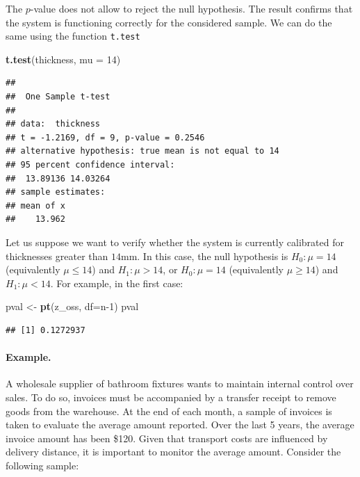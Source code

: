 \documentclass[
]{article}
\newenvironment{Shaded}{\begin{snugshade}}{\end{snugshade}}
\newcommand{\AttributeTok}[1]{\textcolor[rgb]{0.13,0.29,0.53}{#1}}
\newcommand{\DecValTok}[1]{\textcolor[rgb]{0.00,0.00,0.81}{#1}}
\newcommand{\FunctionTok}[1]{\textcolor[rgb]{0.13,0.29,0.53}{\textbf{#1}}}
\newcommand{\NormalTok}[1]{#1}
\newcommand{\OtherTok}[1]{\textcolor[rgb]{0.56,0.35,0.01}{#1}}
\begin{document}
The \(p\)-value does not allow to reject the null hypothesis. The result
confirms that the system is functioning correctly for the considered
sample. We can do the same using the function \texttt{t.test}

\begin{Shaded}
\begin{Highlighting}[]
\FunctionTok{t.test}\NormalTok{(thickness, }\AttributeTok{mu =} \DecValTok{14}\NormalTok{)}
\end{Highlighting}
\end{Shaded}

\begin{verbatim}
## 
##  One Sample t-test
## 
## data:  thickness
## t = -1.2169, df = 9, p-value = 0.2546
## alternative hypothesis: true mean is not equal to 14
## 95 percent confidence interval:
##  13.89136 14.03264
## sample estimates:
## mean of x 
##    13.962
\end{verbatim}

Let us suppose we want to verify whether the system is currently
calibrated for thicknesses greater than \(14 \text{mm}\). In this case,
the null hypothesis is \(H_0: \mu = 14\) (equivalently \(\mu \leq 14\))
and \(H_1: \mu > 14\), or \(H_0: \mu = 14\) (equivalently
\(\mu \geq 14\)) and \(H_1: \mu < 14\). For example, in the first case:

\begin{Shaded}
\begin{Highlighting}[]
\NormalTok{pval }\OtherTok{\textless{}{-}} \FunctionTok{pt}\NormalTok{(z\_oss, }\AttributeTok{df=}\NormalTok{n}\DecValTok{{-}1}\NormalTok{)}
\NormalTok{pval}
\end{Highlighting}
\end{Shaded}

\begin{verbatim}
## [1] 0.1272937
\end{verbatim}

\hypertarget{example.}{%
\paragraph{Example.}\label{example.}}

A wholesale supplier of bathroom fixtures wants to maintain internal
control over sales. To do so, invoices must be accompanied by a transfer
receipt to remove goods from the warehouse. At the end of each month, a
sample of invoices is taken to evaluate the average amount reported.
Over the last 5 years, the average invoice amount has been \$120. Given
that transport costs are influenced by delivery distance, it is
important to monitor the average amount. Consider the following sample:
\end{document}
